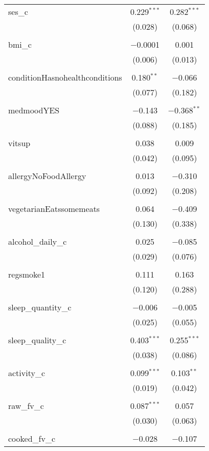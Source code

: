 \documentclass[
]{article}
\begin{document}
\begin{table}[!htbp]
\begin{tabular}{@{\extracolsep{5pt}}lcc}
 ses\_c & 0.229$^{***}$ & 0.282$^{***}$ \\ 
  & (0.028) & (0.068) \\ 
  & & \\ 
 bmi\_c & $-$0.0001 & 0.001 \\ 
  & (0.006) & (0.013) \\ 
  & & \\ 
 conditionHasnohealthconditions & 0.180$^{**}$ & $-$0.066 \\ 
  & (0.077) & (0.182) \\ 
  & & \\ 
 medmoodYES & $-$0.143 & $-$0.368$^{**}$ \\ 
  & (0.088) & (0.185) \\ 
  & & \\ 
 vitsup & 0.038 & 0.009 \\ 
  & (0.042) & (0.095) \\ 
  & & \\ 
 allergyNoFoodAllergy & 0.013 & $-$0.310 \\ 
  & (0.092) & (0.208) \\ 
  & & \\ 
 vegetarianEatssomemeats & 0.064 & $-$0.409 \\ 
  & (0.130) & (0.338) \\ 
  & & \\ 
 alcohol\_daily\_c & 0.025 & $-$0.085 \\ 
  & (0.029) & (0.076) \\ 
  & & \\ 
 regsmoke1 & 0.111 & 0.163 \\ 
  & (0.120) & (0.288) \\ 
  & & \\ 
 sleep\_quantity\_c & $-$0.006 & $-$0.005 \\ 
  & (0.025) & (0.055) \\ 
  & & \\ 
 sleep\_quality\_c & 0.403$^{***}$ & 0.255$^{***}$ \\ 
  & (0.038) & (0.086) \\ 
  & & \\ 
 activity\_c & 0.099$^{***}$ & 0.103$^{**}$ \\ 
  & (0.019) & (0.042) \\ 
  & & \\ 
 raw\_fv\_c & 0.087$^{***}$ & 0.057 \\ 
  & (0.030) & (0.063) \\ 
  & & \\ 
 cooked\_fv\_c & $-$0.028 & $-$0.107 \\ 

\end{tabular}
\end{table}
\end{document}
